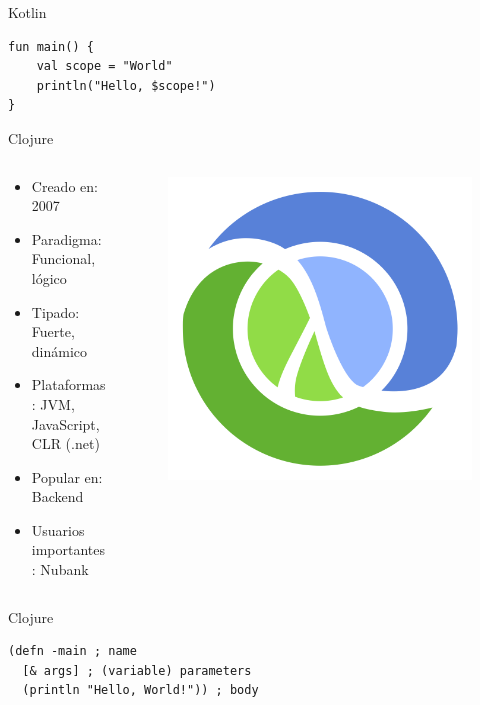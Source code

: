 \documentclass[aspectratio=169]{beamer}
\begin{document}
\begin{frame}[fragile]{Kotlin}
\begin{lstlisting}
fun main() {
    val scope = "World"
    println("Hello, $scope!")
}
\end{lstlisting}
\end{frame}



\begin{frame}{Clojure}
	\begin{columns}[T] %
		\begin{column}[T]{0.5\textwidth} %
			\begin{itemize}
				\item Creado en: 2007
				\item Paradigma: Funcional, lógico
				\item Tipado: Fuerte, dinámico
				\item Plataformas: JVM, JavaScript, CLR (.net)
				\item Popular en: Backend
				\item Usuarios importantes: Nubank
			\end{itemize}
		\end{column}
		\begin{column}[T]{7cm} %
			\begin{figure}
				\centering
				\includegraphics[width=0.5\linewidth]{Images/clojure}
			\end{figure}

		\end{column}
	\end{columns}
\end{frame}

\begin{frame}[fragile]{Clojure}
\begin{lstlisting}
(defn -main ; name
  [& args] ; (variable) parameters
  (println "Hello, World!")) ; body
\end{lstlisting}
\end{frame}
\end{document}
